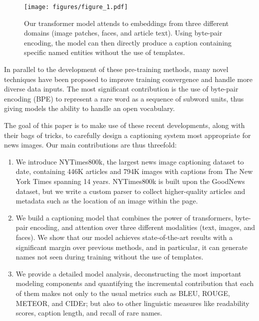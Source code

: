 \begin{figure}[t]
   \begin{center}
      \texttt{[image: figures/figure\_1.pdf]}
   \end{center}
      \caption{Our transformer model attends to embeddings from three different
      domains (image patches, faces, and article text). Using byte-pair
      encoding, the model can then directly produce a caption containing
      specific named entities without the use of templates.}
   \label{fig:long}
   \label{fig:onecol}
\end{figure}

In parallel to the development of these pre-training methods, many novel
techniques have been proposed to improve training convergence and handle more
diverse data inputs. The most significant contribution is the use of byte-pair
encoding (BPE) \cite{Sennrich2015NeuralMT} to represent a rare word as a
sequence of subword units, thus giving models the ability to handle an open
vocabulary.

The goal of this paper is to make use of these recent developments, along with
their bags of tricks, to carefully design a captioning system most appropriate
for news images. Our main contributions are thus threefold:

\begin{enumerate}
   \item We introduce NYTimes800k, the largest news image captioning dataset to
   date, containing 446K articles and 794K images with captions from The New
   York Times spanning 14 years. NYTimes800k is built upon the GoodNews dataset,
   but we write a custom parser to collect higher-quality articles and metadata
   such as the location of an image within the page.

   \item We build a captioning model that combines the power of transformers,
   byte-pair encoding, and attention over three different modalities (text,
   images, and faces). We show that our model achieves state-of-the-art results
   with a significant margin over previous methods, and in particular, it can
   generate names not seen during training without the use of templates.

   \item We provide a detailed model analysis, deconstructing the most
   important modeling components and quantifying the incremental contribution
   that each of them makes not only to the usual metrics such as BLEU, ROUGE,
   METEOR, and CIDEr; but also to other linguistic measures like readability
   scores, caption length, and recall of rare names.
\end{enumerate}
